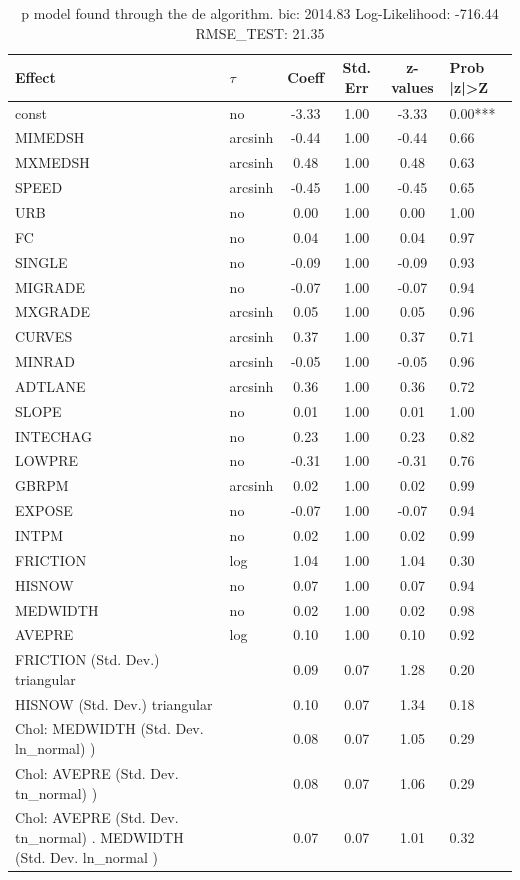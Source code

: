\begin{table}
	\caption{p model found through the de algorithm. bic: 2014.83 Log-Likelihood: -716.44 RMSE_TEST: 21.35}
	\begin{center}
		\begin{tabular}{|l|l|c|c|c|l|}
			\hline
			Effect & $\tau$ & Coeff & Std. Err & z-values & Prob |z|>Z \\
			\hline
			const & no & -3.33 & 1.00 & -3.33 & 0.00*** \\
			\hline
			MIMEDSH & arcsinh & -0.44 & 1.00 & -0.44 & 0.66 \\
			\hline
			MXMEDSH & arcsinh & 0.48 & 1.00 & 0.48 & 0.63 \\
			\hline
			SPEED & arcsinh & -0.45 & 1.00 & -0.45 & 0.65 \\
			\hline
			URB & no & 0.00 & 1.00 & 0.00 & 1.00 \\
			\hline
			FC & no & 0.04 & 1.00 & 0.04 & 0.97 \\
			\hline
			SINGLE & no & -0.09 & 1.00 & -0.09 & 0.93 \\
			\hline
			MIGRADE & no & -0.07 & 1.00 & -0.07 & 0.94 \\
			\hline
			MXGRADE & arcsinh & 0.05 & 1.00 & 0.05 & 0.96 \\
			\hline
			CURVES & arcsinh & 0.37 & 1.00 & 0.37 & 0.71 \\
			\hline
			MINRAD & arcsinh & -0.05 & 1.00 & -0.05 & 0.96 \\
			\hline
			ADTLANE & arcsinh & 0.36 & 1.00 & 0.36 & 0.72 \\
			\hline
			SLOPE & no & 0.01 & 1.00 & 0.01 & 1.00 \\
			\hline
			INTECHAG & no & 0.23 & 1.00 & 0.23 & 0.82 \\
			\hline
			LOWPRE & no & -0.31 & 1.00 & -0.31 & 0.76 \\
			\hline
			GBRPM & arcsinh & 0.02 & 1.00 & 0.02 & 0.99 \\
			\hline
			EXPOSE & no & -0.07 & 1.00 & -0.07 & 0.94 \\
			\hline
			INTPM & no & 0.02 & 1.00 & 0.02 & 0.99 \\
			\hline
			FRICTION & log & 1.04 & 1.00 & 1.04 & 0.30 \\
			\hline
			HISNOW & no & 0.07 & 1.00 & 0.07 & 0.94 \\
			\hline
			MEDWIDTH & no & 0.02 & 1.00 & 0.02 & 0.98 \\
			\hline
			AVEPRE & log & 0.10 & 1.00 & 0.10 & 0.92 \\
			\hline
			FRICTION (Std. Dev.) triangular &  & 0.09 & 0.07 & 1.28 & 0.20 \\
			\hline
			HISNOW (Std. Dev.) triangular &  & 0.10 & 0.07 & 1.34 & 0.18 \\
			\hline
			 Chol: MEDWIDTH (Std. Dev. ln_normal) ) &  & 0.08 & 0.07 & 1.05 & 0.29 \\
			\hline
			 Chol: AVEPRE (Std. Dev. tn_normal) ) &  & 0.08 & 0.07 & 1.06 & 0.29 \\
			\hline
			 Chol: AVEPRE (Std. Dev. tn_normal) . MEDWIDTH (Std. Dev.   ln_normal ) &  & 0.07 & 0.07 & 1.01 & 0.32 \\
			\hline
		\end{tabular}
	\end{center}
\end{table}